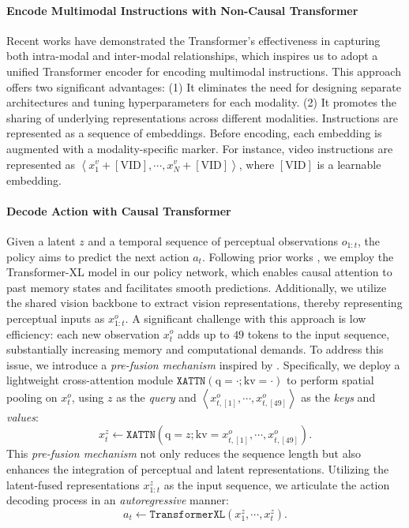 \paragraph{Encode Multimodal Instructions with Non-Causal Transformer} 
Recent works \citep{gato, uio2, gemini} have demonstrated the Transformer's effectiveness in capturing both intra-modal and inter-modal relationships, which inspires us to adopt a unified Transformer encoder for encoding multimodal instructions. This approach offers two significant advantages: (1) It eliminates the need for designing separate architectures and tuning hyperparameters for each modality. (2) It promotes the sharing of underlying representations across different modalities. Instructions are represented as a sequence of embeddings. Before encoding, each embedding is augmented with a modality-specific marker. For instance, video instructions are represented as $\left< {x}^{v}_{1} + [\text{VID}], \cdots, {x}^{v}_{N} + [\text{VID}] \right>$, where $[\text{VID}]$ is a learnable embedding. 


\paragraph{Decode Action with Causal Transformer} 
Given a latent $z$ and a temporal sequence of perceptual observations $o_{1:t}$, the policy aims to predict the next action $a_{t}$. 
Following prior works \citep{vpt, groot1, sima}, we employ the Transformer-XL model \citep{transformerxl} in our policy network, which enables causal attention to past memory states and facilitates smooth predictions. Additionally, we utilize the shared vision backbone to extract vision representations, thereby representing perceptual inputs as $x^{o}_{1:t}$. A significant challenge with this approach is low efficiency: each new observation $x^{o}_t$ adds up to $49$ tokens to the input sequence, substantially increasing memory and computational demands. To address this issue, we introduce a \textit{pre-fusion mechanism} inspired by \cite{iii, language_table, flamingo}. Specifically, we deploy a lightweight cross-attention module $\texttt{XATTN}(\text{q}=\cdot; \text{kv}=\cdot)$ to perform spatial pooling on $x^{o}_t$, using $z$ as the \textit{query} and $\left< x^{o}_{t, [1]}, \cdots, x^{o}_{t, [49]} \right>$ as the \textit{keys} and \textit{values}:
\begin{equation}
    x^{z}_{t} \leftarrow \texttt{XATTN}(\text{q}=z; \text{kv}=x^{o}_{t, [1]}, \cdots, x^{o}_{t, [49]}). 
\end{equation}
This \textit{pre-fusion mechanism} not only reduces the sequence length but also enhances the integration of perceptual and latent representations. Utilizing the latent-fused representations $x^{z}_{1:t}$ as the input sequence, we articulate the action decoding process in an \textit{autoregressive} manner:
\begin{equation}
a_t \leftarrow \texttt{TransformerXL}(x^{z}_{1}, \cdots, x^{z}_{t}). 
\end{equation}

